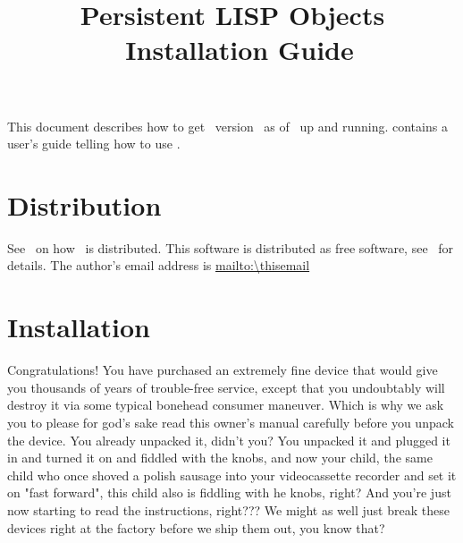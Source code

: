 %
%
\def\WideOption{}%
\def\ClassName{article}
\def\thistitle{Installation Guide}
\def\thispartnumber{IG}
%
%
%
\addtolength\textwidth      {20mm}%
\addtolength\evensidemargin {-20mm}%
\addtolength\textheight     {16.10072mm}%
\let\CodeSize\small
%


\newcommand{\lb}{\linebreak[0]}                 %
\def\osname{\textrm{\textit{\lt{}operating system name\gt}}}
\def\shortosname{\textrm{\textit{\lt{}opsys\gt}}}

\title{\ifx\avb\undefined\relax\else\avb\fi%
Persistent LISP Objects\\
\plob\ \thistitle}
\author{\thisauthor}%
\maketitle

This document describes how to get \plob\ version \thisversion\ as of
\thisdate\ up and running.  \cite{bib:PLOB-UsersGuide} contains a
user's guide telling how to use \plob.

\section{Distribution}

See \ on how \plob\ is distributed.
This software is distributed as free software, see \ for details. The author's email address is
\url{mailto:\thisemail}

\section{Installation}

\begin{fortune}[0.9\textwidth]
Congratulations!  You have purchased an extremely fine device that
would give you thousands of years of trouble-free service, except that
you undoubtably will destroy it via some typical bonehead consumer
maneuver.  Which is why we ask you to {\sc please for god's sake read
this owner's manual carefully before you unpack the device.  You
already unpacked it, didn't you?  You unpacked it and plugged it in
and turned it on and fiddled with the knobs, and now your child, the
same child who once shoved a polish sausage into your videocassette
recorder and set it on "fast forward", this child also is fiddling
with he knobs, right?  And you're just now starting to read the
instructions, right???  We might as well just break these devices
right at the factory before we ship them out, you know that?}
\end{fortune}%

